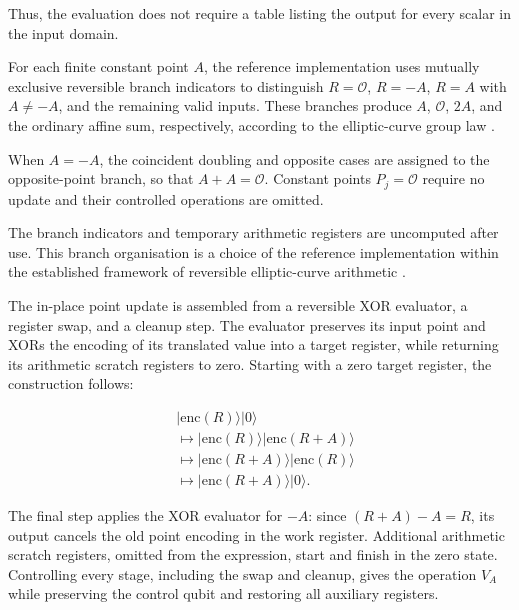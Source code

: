 \begin{revision}
Thus, the evaluation does not require a table listing the output for every scalar in the input domain. 

For each finite constant point $A$, the reference implementation uses mutually exclusive reversible branch indicators to distinguish $R=\mathcal{O}$, $R=-A$, $R=A$ with $A\neq -A$, and the remaining valid inputs. These branches produce $A$, $\mathcal{O}$, $2A$, and the ordinary affine sum, respectively, according to the elliptic-curve group law \cite{Silverman2009,Washington2008}.

When $A=-A$, the coincident doubling and opposite cases are assigned to the opposite-point branch, so that $A+A=\mathcal{O}$. Constant points $P_j=\mathcal{O}$ require no update and their controlled operations are omitted.

The branch indicators and temporary arithmetic registers are uncomputed after use. This branch organisation is a choice of the reference implementation within the established framework of reversible elliptic-curve arithmetic \cite{ProosZalka2003,Roetteler2017}.

The in-place point update is assembled from a reversible XOR evaluator, a register swap, and a cleanup step. The evaluator preserves its input point and XORs the encoding of its translated value into a target register, while returning its arithmetic scratch registers to zero. Starting with a zero target register, the construction follows:

\begin{equation}
    \label{eq:point_update_cleanup}
    \begin{aligned}
        &\lvert\mathrm{enc}(R)\rangle\lvert0\rangle\\
        &\longmapsto
         \lvert\mathrm{enc}(R)\rangle
         \lvert\mathrm{enc}(R+A)\rangle\\
        &\longmapsto
         \lvert\mathrm{enc}(R+A)\rangle
         \lvert\mathrm{enc}(R)\rangle\\
        &\longmapsto
         \lvert\mathrm{enc}(R+A)\rangle
         \lvert0\rangle.
    \end{aligned}
\end{equation}


The final step applies the XOR evaluator for $-A$: since $(R+A)-A=R$, its output cancels the old point encoding in the work register. Additional arithmetic scratch registers, omitted from the expression, start and finish in the zero state. Controlling every stage, including the swap and cleanup, gives the operation $V_A$ while preserving the control qubit and restoring all auxiliary registers.


\end{revision}
